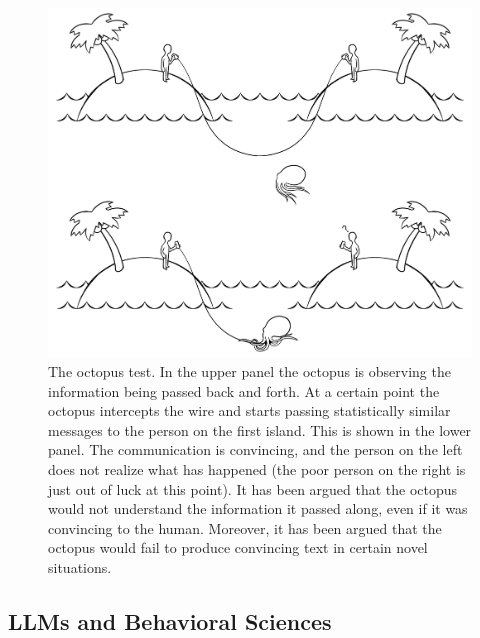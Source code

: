 \begin{figure}[ht]
\centering
\includegraphics[scale=.20]{./images/octopusTest.png}
\caption[Soraya Boza.]{The octopus test. In the upper panel the octopus is
observing the information being passed back and forth. At a certain point the
octopus intercepts the wire and starts passing statistically similar messages
to the person on the first island. This is shown in the lower panel. The
communication is convincing, and the person on the left does not realize what
has happened (the poor person on the right is just out of luck at this point).
It has been argued that the octopus would not understand the information it
passed along, even if it was convincing to the human. Moreover, it has been
argued that the octopus would fail to produce convincing text in certain novel
situations.
}
\label{octopusTest}
\end{figure}


\subsection{LLMs and Behavioral Sciences}\label{llmsBehavioral}

